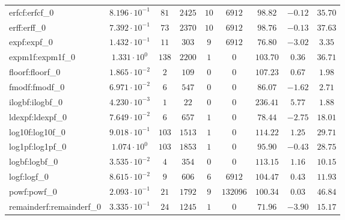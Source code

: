 \begin{tabular}{|l|c|c|c|c|c|c|c|c|}
erfcf:erfcf\_0               & $ 8.196 \cdot 10^{-1} $ & $ 81     $ & $ 2425  $ & $ 10  $ & $ 6912   $ & $ 98.82       $ & $ -0.12   $ & $ 35.70   $ \\
erff:erff\_0                 & $ 7.392 \cdot 10^{-1} $ & $ 73     $ & $ 2370  $ & $ 10  $ & $ 6912   $ & $ 98.76       $ & $ -0.13   $ & $ 37.63   $ \\
expf:expf\_0                 & $ 1.432 \cdot 10^{-1} $ & $ 11     $ & $ 303   $ & $ 9   $ & $ 6912   $ & $ 76.80       $ & $ -3.02   $ & $ 3.35    $ \\
expm1f:expm1f\_0             & $ 1.331 \cdot 10^{0}  $ & $ 138    $ & $ 2200  $ & $ 1   $ & $ 0      $ & $ 103.70      $ & $ 0.36    $ & $ 36.71   $ \\
floorf:floorf\_0             & $ 1.865 \cdot 10^{-2} $ & $ 2      $ & $ 109   $ & $ 0   $ & $ 0      $ & $ 107.23      $ & $ 0.67    $ & $ 1.98    $ \\
fmodf:fmodf\_0               & $ 6.971 \cdot 10^{-2} $ & $ 6      $ & $ 547   $ & $ 0   $ & $ 0      $ & $ 86.07       $ & $ -1.62   $ & $ 2.71    $ \\
ilogbf:ilogbf\_0             & $ 4.230 \cdot 10^{-3} $ & $ 1      $ & $ 22    $ & $ 0   $ & $ 0      $ & $ 236.41      $ & $ 5.77    $ & $ 1.88    $ \\
ldexpf:ldexpf\_0             & $ 7.649 \cdot 10^{-2} $ & $ 6      $ & $ 657   $ & $ 1   $ & $ 0      $ & $ 78.44       $ & $ -2.75   $ & $ 18.01   $ \\
log10f:log10f\_0             & $ 9.018 \cdot 10^{-1} $ & $ 103    $ & $ 1513  $ & $ 1   $ & $ 0      $ & $ 114.22      $ & $ 1.25    $ & $ 29.71   $ \\
log1pf:log1pf\_0             & $ 1.074 \cdot 10^{0}  $ & $ 103    $ & $ 1853  $ & $ 1   $ & $ 0      $ & $ 95.90       $ & $ -0.43   $ & $ 28.75   $ \\
logbf:logbf\_0               & $ 3.535 \cdot 10^{-2} $ & $ 4      $ & $ 354   $ & $ 0   $ & $ 0      $ & $ 113.15      $ & $ 1.16    $ & $ 10.15   $ \\
logf:logf\_0                 & $ 8.615 \cdot 10^{-2} $ & $ 9      $ & $ 606   $ & $ 6   $ & $ 6912   $ & $ 104.47      $ & $ 0.43    $ & $ 11.93   $ \\
powf:powf\_0                 & $ 2.093 \cdot 10^{-1} $ & $ 21     $ & $ 1792  $ & $ 9   $ & $ 132096 $ & $ 100.34      $ & $ 0.03    $ & $ 46.84   $ \\
remainderf:remainderf\_0     & $ 3.335 \cdot 10^{-1} $ & $ 24     $ & $ 1245  $ & $ 1   $ & $ 0      $ & $ 71.96       $ & $ -3.90   $ & $ 15.17   $ \\

\end{tabular}
